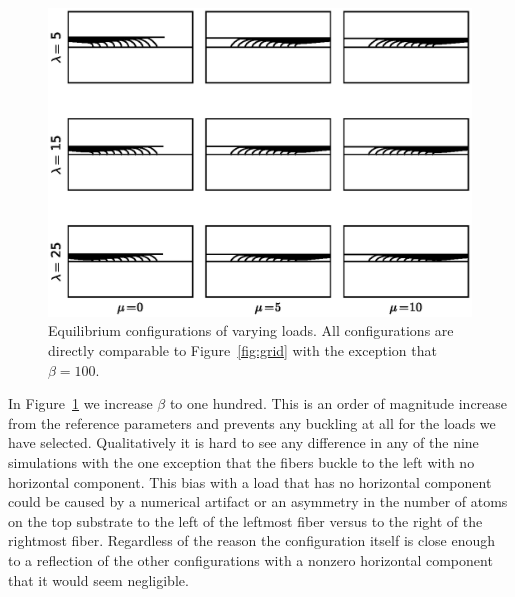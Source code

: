 	\begin{figure}
		\begin{center}
			\includegraphics[scale=1]{./fig/ch4/grid_b100.eps}
		\end{center}		
		\caption{Equilibrium configurations of varying loads. All configurations are directly comparable to Figure~\ref{fig:grid} with the exception that $\beta = 100$.
		\label{fig:grid_b100}}
	\end{figure}

	In Figure~\ref{fig:grid_b100} we increase $\beta$ to one hundred. This is an order of magnitude increase from the reference parameters and prevents any buckling at all for the loads we have selected. Qualitatively it is hard to see any difference in any of the nine simulations with the one exception that the fibers buckle to the left with no horizontal component. This bias with a load that has no horizontal component could be caused by a numerical artifact or an asymmetry in the number of atoms on the top substrate to the left of the leftmost fiber versus to the right of the rightmost fiber. Regardless of the reason the configuration itself is close enough to a reflection of the other configurations with a nonzero horizontal component that it would seem negligible.
	
